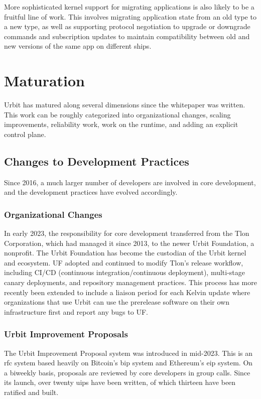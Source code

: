 \documentclass[twoside]{article}
\begin{document}
More sophisticated kernel support for migrating applications is also likely to be a fruitful line of work.  This involves migrating application state from an old type to a new type, as well as supporting protocol negotiation to upgrade or downgrade commands and subscription updates to maintain compatibility between old and new versions of the same app on different ships.

\section{Maturation}

Urbit has matured along several dimensions since the whitepaper was written.  This work can be roughly categorized into organizational changes, scaling improvements, reliability work, work on the runtime, and adding an explicit control plane.

\subsection{Changes to Development Practices}

Since 2016, a much larger number of developers are involved in core development, and the development practices have evolved accordingly.

\subsubsection{Organizational Changes}

In early 2023, the responsibility for core development transferred from the Tlon Corporation, which had managed it since 2013, to the newer Urbit Foundation, a nonprofit.  The Urbit Foundation has become the custodian of the Urbit kernel and ecosystem.  UF adopted and continued to modify Tlon's release workflow, including CI/CD (continuous integration/continuous deployment), multi-stage canary deployments, and repository management practices.  This process has more recently been extended to include a liaison period for each Kelvin update where organizations that use Urbit can use the prerelease software on their own infrastructure first and report any bugs to UF.

\subsubsection{Urbit Improvement Proposals}

The Urbit Improvement Proposal system was introduced in mid-2023.  This is an {\sc rfc} system based heavily on Bitcoin's {\sc bip} system and Ethereum's {\sc eip} system.  On a biweekly basis, proposals are reviewed by core developers in group calls.  Since its launch, over twenty {\sc uip}s have been written, of which thirteen have been ratified and built.
\end{document}
